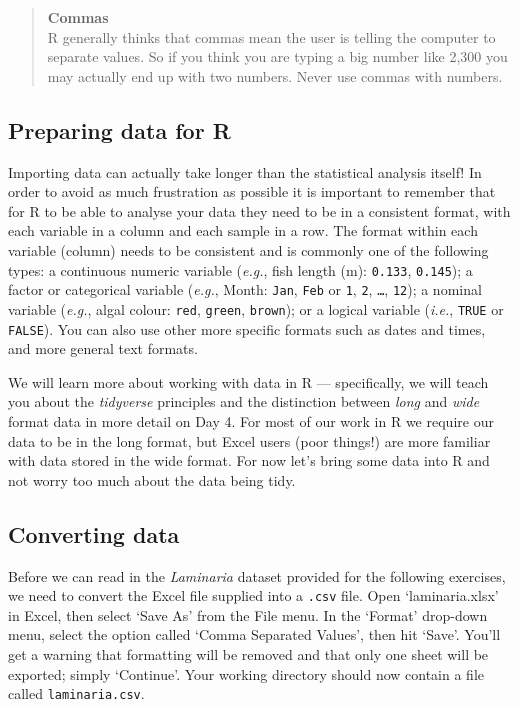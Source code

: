 \documentclass[
]{book}
\begin{document}
\begin{quote}
\textbf{Commas}\\
R generally thinks that commas mean the user is telling the computer to separate values. So if you think you are typing a big number like 2,300 you may actually end up with two numbers. Never use commas with numbers.
\end{quote}

\hypertarget{preparing-data-for-r}{%
\subsection{Preparing data for R}\label{preparing-data-for-r}}

Importing data can actually take longer than the statistical analysis itself! In order to avoid as much frustration as possible it is important to remember that for R to be able to analyse your data they need to be in a consistent format, with each variable in a column and each sample in a row. The format within each variable (column) needs to be consistent and is commonly one of the following types: a continuous numeric variable (\emph{e.g.}, fish length (m): \texttt{0.133}, \texttt{0.145}); a factor or categorical variable (\emph{e.g.}, Month: \texttt{Jan}, \texttt{Feb} or \texttt{1}, \texttt{2}, \texttt{\ldots{}}, \texttt{12}); a nominal variable (\emph{e.g.}, algal colour: \texttt{red}, \texttt{green}, \texttt{brown}); or a logical variable (\emph{i.e.}, \texttt{TRUE} or \texttt{FALSE}). You can also use other more specific formats such as dates and times, and more general text formats.

We will learn more about working with data in R --- specifically, we will teach you about the \emph{tidyverse} principles and the distinction between \emph{long} and \emph{wide} format data in more detail on Day 4. For most of our work in R we require our data to be in the long format, but Excel users (poor things!) are more familiar with data stored in the wide format. For now let's bring some data into R and not worry too much about the data being tidy.

\hypertarget{converting-data}{%
\subsection{Converting data}\label{converting-data}}

Before we can read in the \emph{Laminaria} dataset provided for the following exercises, we need to convert the Excel file supplied into a \texttt{.csv} file. Open `laminaria.xlsx' in Excel, then select `Save As' from the File menu. In the `Format' drop-down menu, select the option called `Comma Separated Values', then hit `Save'. You'll get a warning that formatting will be removed and that only one sheet will be exported; simply `Continue'. Your working directory should now contain a file called \texttt{laminaria.csv}.
\end{document}
